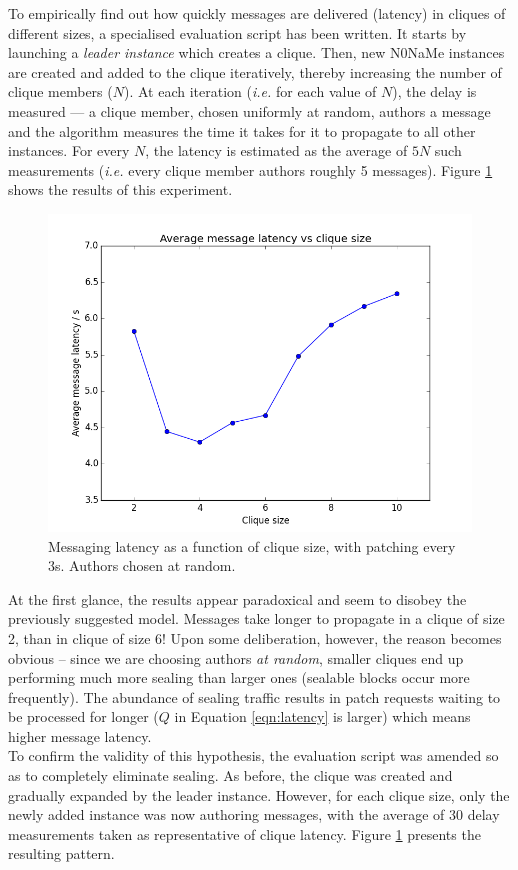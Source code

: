 \documentclass[a4paper, twoside, 12pt]{report}
\newcommand{\funkytt}{\fontfamily{AnonymousPro}\selectfont}
\begin{document}
To empirically find out how quickly messages are delivered (latency) in cliques of different sizes, a specialised evaluation script has been written. It starts by launching a \emph{leader instance} which creates a clique. Then, new {\funkytt N0NaMe} instances are created and added to the clique iteratively, thereby increasing the number of clique members ($N$). At each iteration (\textit{i.e.} for each value of $N$), the delay is measured --- a clique member, chosen uniformly at random, authors a message and the algorithm measures the time it takes for it to propagate to all other instances. For every $N$, the latency is estimated as the average of $5N$ such measurements (\textit{i.e.} every clique member authors roughly 5 messages). Figure \ref{fig:latency_vs_N} shows the results of this experiment.

\begin{figure}[H]
    \captionsetup{width=0.8\textwidth}
    \centering
    \includegraphics[width=0.65\linewidth]{pics/eval/latency_vs_N_seal.png}
    \caption{\label{fig:latency_vs_N} Messaging latency as a function of clique size, with patching every 3s. Authors chosen at random.}
\end{figure}

At the first glance, the results appear paradoxical and seem to disobey the previously suggested model. Messages take longer to propagate in a clique of size 2, than in clique of size 6! Upon some deliberation, however, the reason becomes obvious -- since we are choosing authors \emph{at random}, smaller cliques end up performing much more sealing than larger ones (sealable blocks occur more frequently). The abundance of sealing traffic results in patch requests waiting to be processed for longer ($Q$ in Equation \ref{eqn:latency} is larger) which means higher message latency. \\

To confirm the validity of this hypothesis, the evaluation script was amended so as to completely eliminate sealing. As before, the clique was created and gradually expanded by the leader instance. However, for each clique size, only the newly added instance was now authoring messages, with the average of 30 delay measurements taken as representative of clique latency. Figure \ref{fig:latency_vs_N} presents the resulting pattern. \\
\end{document}
